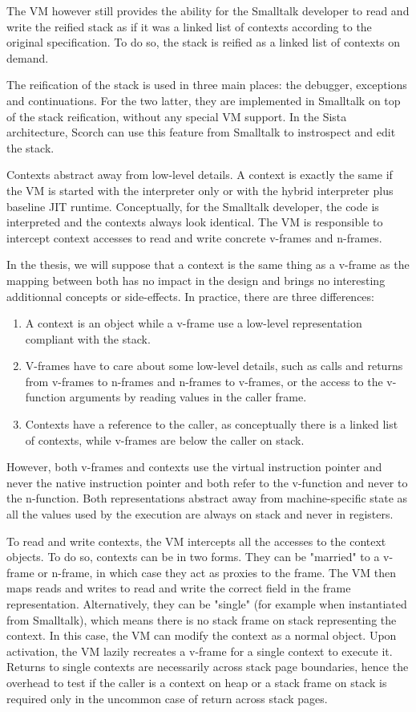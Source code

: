 \documentclass[a4paper,12pt,twoside]{../includes/ThesisStyle}
\begin{document}
The VM however still provides the ability for the Smalltalk developer to read and write the reified stack as if it was a linked list of contexts according to the original specification. To do so, the stack is reified as a linked list of contexts on demand. 

The reification of the stack is used in three main places: the debugger, exceptions and continuations. For the two latter, they are implemented in Smalltalk on top of the stack reification, without any special VM support. In the Sista architecture, Scorch can use this feature from Smalltalk to instrospect and edit the stack.

Contexts abstract away from low-level details. A context is exactly the same if the VM is started with the interpreter only or with the hybrid interpreter plus baseline JIT runtime. Conceptually, for the Smalltalk developer, the code is interpreted and the contexts always look identical. The VM is responsible to intercept context accesses to read and write concrete v-frames and n-frames.

In the thesis, we will suppose that a context is the same thing as a v-frame as the mapping between both has no impact in the design and brings no interesting additionnal concepts or side-effects. In practice, there are three differences:
\begin{enumerate}
	\item A context is an object while a v-frame use a low-level representation compliant with the stack.
	\item V-frames have to care about some low-level details, such as calls and returns from v-frames to n-frames and n-frames to v-frames, or the access to the v-function arguments by reading values in the caller frame. 
	\item Contexts have a reference to the caller, as conceptually there is a linked list of contexts, while v-frames are below the caller on stack.
\end{enumerate}
However, both v-frames and contexts use the virtual instruction pointer and never the native instruction pointer and both refer to the v-function and never to the n-function. Both representations abstract away from machine-specific state as all the values used by the execution are always on stack and never in registers.

To read and write contexts, the VM intercepts all the accesses to the context objects. To do so, contexts can be in two forms. They can be "married" to a v-frame or n-frame, in which case they act as proxies to the frame. The VM then maps reads and writes to read and write the correct field in the frame representation. Alternatively, they can be "single" (for example when instantiated from Smalltalk), which means there is no stack frame on stack representing the context. In this case, the VM can modify the context as a normal object. Upon activation, the VM lazily recreates a v-frame for a single context to execute it. Returns to single contexts are necessarily across stack page boundaries, hence the overhead to test if the caller is a context on heap or a stack frame on stack is required only in the uncommon case of return across stack pages. 
\end{document}

